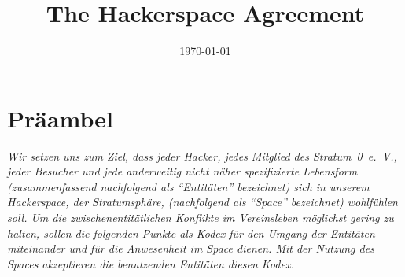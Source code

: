 \documentclass[12pt,a4paper]{scrartcl}
\title{The Hackerspace Agreement}
\date{\today}
\begin{document}
\maketitle

\section*{Präambel}
{\itshape
Wir setzen uns zum Ziel, dass jeder Hacker, jedes Mitglied des Stratum~0~e.~V.,
jeder Besucher und jede anderweitig nicht näher spezifizierte Lebensform
(zusammenfassend nachfolgend als "`Entitäten"' bezeichnet) sich in unserem
Hackerspace, der \emph{Stratumsphäre}, (nachfolgend als "`Space"' bezeichnet)
wohlfühlen soll. Um die zwischenentitätlichen Konflikte im Vereinsleben
möglichst gering zu halten, sollen die folgenden Punkte als Kodex
für den Umgang der Entitäten miteinander und für die Anwesenheit im Space
dienen. Mit der Nutzung des Spaces akzeptieren die benutzenden Entitäten diesen
Kodex.
}
\end{document}
